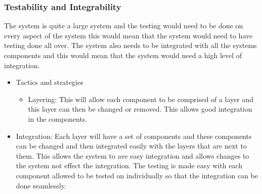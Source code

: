 \subsubsection{Testability and Integrability}
\begin{flushleft}
The system is quite a large system and the testing would need to be done on every aspect of the system this would mean that the system would need to have testing done all over. The system also needs to be integrated with all the systems components and this would mean that the system would need a high level of integration.
\begin{itemize}
\item{Tactics and strategies}
\begin{itemize}
\item{Layering}: This will allow each component to be comprised of a layer and this layer can then be changed or removed. This allows good integration in the components.

\end{itemize}

\item{Integration}: Each layer will have a set of components and these components can be changed and then integrated easily with the layers that are next to them. This allows the system to ave easy integration and allows changes to the system not effect the integration. The testing is made easy with each component allowed to be tested on individually so that the integration can be done seamlessly.
\end{itemize}

\end{flushleft}
		